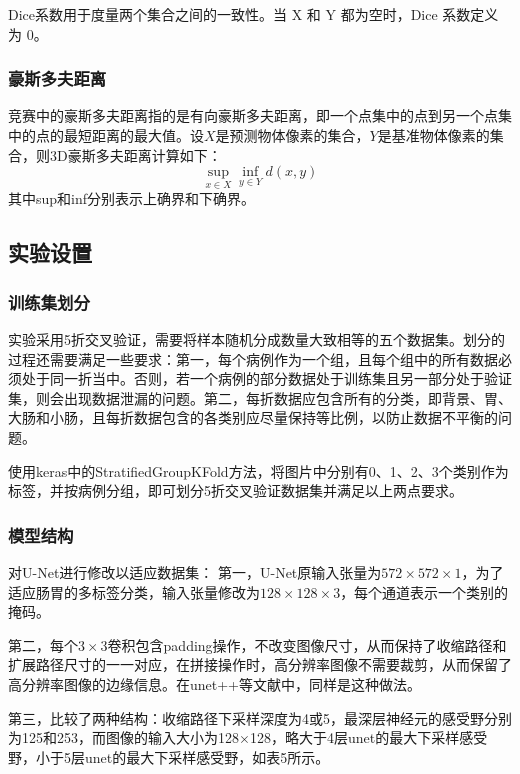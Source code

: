 \documentclass[letterpaper, 10pt, conference, twoside]{ieeeconf}
\begin{document}
Dice系数用于度量两个集合之间的一致性。当 X 和 Y 都为空时，Dice 系数定义为 0。

\subsubsection{豪斯多夫距离}

竞赛中的豪斯多夫距离指的是有向豪斯多夫距离，即一个点集中的点到另一个点集中的点的最短距离的最大值。设$X$是预测物体像素的集合，$Y$是基准物体像素的集合，则3D豪斯多夫距离计算如下：
\[\sup_{x\in X} \inf_{y\in Y} d(x,y)\]
其中sup和inf分别表示上确界和下确界。

\subsection{实验设置}

\subsubsection{训练集划分}

实验采用5折交叉验证，需要将样本随机分成数量大致相等的五个数据集。划分的过程还需要满足一些要求：第一，每个病例作为一个组，且每个组中的所有数据必须处于同一折当中。否则，若一个病例的部分数据处于训练集且另一部分处于验证集，则会出现数据泄漏的问题。第二，每折数据应包含所有的分类，即背景、胃、大肠和小肠，且每折数据包含的各类别应尽量保持等比例，以防止数据不平衡的问题。

使用keras中的StratifiedGroupKFold方法，将图片中分别有0、1、2、3个类别作为标签，并按病例分组，即可划分5折交叉验证数据集并满足以上两点要求。

\subsubsection{模型结构}

对U-Net进行修改以适应数据集：
第一，U-Net原输入张量为$572\times 572\times 1$，为了适应肠胃的多标签分类，输入张量修改为$128\times 128\times 3$，每个通道表示一个类别的掩码。

第二，每个$3\times 3$卷积包含padding操作，不改变图像尺寸，从而保持了收缩路径和扩展路径尺寸的一一对应，在拼接操作时，高分辨率图像不需要裁剪，从而保留了高分辨率图像的边缘信息。在unet++等文献中，同样是这种做法。

第三，比较了两种结构：收缩路径下采样深度为4或5，最深层神经元的感受野分别为125和253，而图像的输入大小为128$\times$128，略大于4层unet的最大下采样感受野，小于5层unet的最大下采样感受野，如表5所示。
\end{document}
